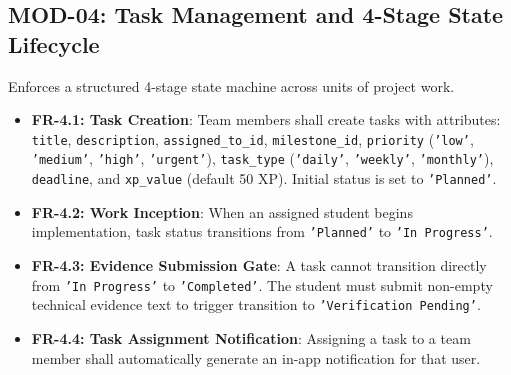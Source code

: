 \documentclass{scrreprt}
\begin{document}
\subsection{MOD-04: Task Management and 4-Stage State Lifecycle}
Enforces a structured 4-stage state machine across units of project work.
\begin{itemize}
    \item \textbf{FR-4.1: Task Creation}: Team members shall create tasks with attributes: \texttt{title}, \texttt{description}, \texttt{assigned\_to\_id}, \texttt{milestone\_id}, \texttt{priority} (\texttt{'low'}, \texttt{'medium'}, \texttt{'high'}, \texttt{'urgent'}), \texttt{task\_type} (\texttt{'daily'}, \texttt{'weekly'}, \texttt{'monthly'}), \texttt{deadline}, and \texttt{xp\_value} (default 50 XP). Initial status is set to \texttt{'Planned'}.
    \item \textbf{FR-4.2: Work Inception}: When an assigned student begins implementation, task status transitions from \texttt{'Planned'} to \texttt{'In Progress'}.
    \item \textbf{FR-4.3: Evidence Submission Gate}: A task cannot transition directly from \texttt{'In Progress'} to \texttt{'Completed'}. The student must submit non-empty technical evidence text to trigger transition to \texttt{'Verification Pending'}.
    \item \textbf{FR-4.4: Task Assignment Notification}: Assigning a task to a team member shall automatically generate an in-app notification for that user.
\end{itemize}
\end{document}
